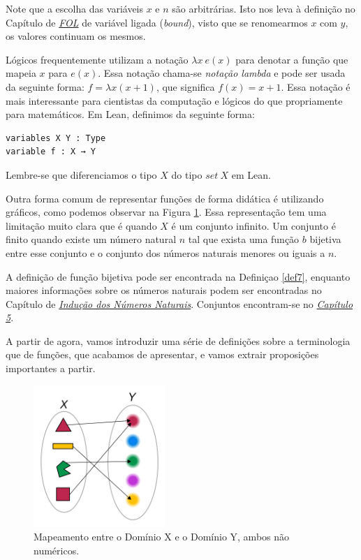 Note que a escolha das variáveis $x$ e $n$ são arbitrárias.
Isto nos leva à definição no Capítulo de \textit{\hyperlink{chapter.4}{FOL}} de
variável ligada (\textit{bound}), visto que se renomearmos $x$ com $y$, os valores
continuam os mesmos.

Lógicos frequentemente utilizam a notação $\lambda x ~e(x)$ para denotar a função
que mapeia $x$ para $e(x)$. Essa notação chama-se \textit{notação lambda} e pode
ser usada da seguinte forma: $f = \lambda x(x + 1)$, que significa $f(x) = x + 1$.
Essa notação é mais interessante para cientistas da computação e lógicos do que
propriamente para matemáticos. Em Lean, definimos da seguinte forma:

\begin{lstlisting}
variables X Y : Type
variable f : X → Y
\end{lstlisting}

Lembre-se que diferenciamos o tipo $X$ do tipo $set~X$ em Lean.

Outra forma comum de representar funções de forma didática é utilizando gráficos, como 
podemos observar na Figura \ref{fig:functions-01-00}. Essa representação tem uma limitação 
muito clara que é quando $X$ é um conjunto infinito. Um conjunto é finito quando existe um 
número natural $n$ tal que exista uma função $b$ bijetiva entre esse conjunto e o conjunto 
dos números naturais menores ou iguais a $n$. 

A definição de função bijetiva pode ser encontrada 
na Definiçao \ref{def7}, enquanto maiores informações sobre os números naturais podem ser encontradas 
no Capítulo de \textit{\hyperlink{chapter.8}{Indução dos Números Naturais}}. Conjuntos encontram-se no 
\textit{\hyperlink{chapter.5}{Capítulo 5}}.

A partir de agora, vamos introduzir uma série de definições sobre a terminologia que de 
funções, que acabamos de apresentar, e vamos extrair proposições importantes a partir. 

\begin{figure}
    \centering      
    \includegraphics[width = 5cm]{figures/functions/fig-functions-01-00.png}
    \caption{Mapeamento entre o Domínio X e o Domínio Y, ambos não numéricos.}
    \label{fig:functions-01-00}
\end{figure}